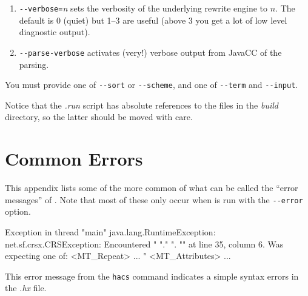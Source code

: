 \documentclass[12pt]{article} %
\begin{document}
\begin{manual}
\begin{enumerate}
  \item \verb"--verbose="\emph{n} sets the verbosity of the underlying \CRSX rewrite engine to $n$. The
    default is 0 (quiet) but 1--3 are useful (above 3 you get a lot of low level diagnostic output).

  \item \verb"--parse-verbose" activates (very!) verbose output from JavaCC of the parsing.

  \end{enumerate}
  You must provide one of \verb"--sort" or \verb"--scheme", and one of \verb"--term" and \verb"--input".

  Notice that the \emph{.run} script has absolute references to the files in the \emph{build}
  directory, so the latter should be moved with care.
\end{manual}




\section{Common Errors}\label{app:errors}

This appendix lists some of the more common of what can be called the ``error messages'' of
\HAX. Note that most of these only occur when \HAX is run with the \verb'--error' option.

\begin{error}\leavevmode
  \begin{code}
Exception in thread "main" java.lang.RuntimeException: net.sf.crsx.CRSException:
 Encountered " "." ". "" at line 35, column 6.
Was expecting one of:
    <MT_Repeat> ...
    "%
    <MT_Attributes> ...
  \end{code}
  This error message from the \verb'hacs' command indicates a simple syntax errors in the \emph{.hx}
  file.
\end{error}
\end{document}
